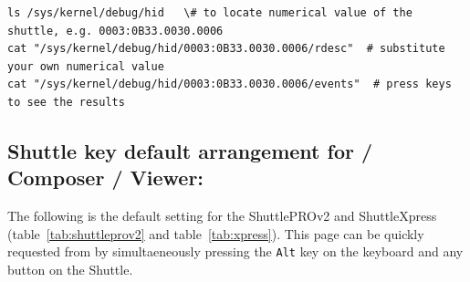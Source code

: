 \begin{lstlisting}[style=sh]
ls /sys/kernel/debug/hid   \# to locate numerical value of the shuttle, e.g. 0003:0B33.0030.0006
cat "/sys/kernel/debug/hid/0003:0B33.0030.0006/rdesc"  # substitute your own numerical value
cat "/sys/kernel/debug/hid/0003:0B33.0030.0006/events"  # press keys to see the results
\end{lstlisting}

\subsection{Shuttle key default arrangement for \CGG{} / Composer / Viewer:}%
\label{sub:shuttle_key_default_cinelerra}

The following is the default setting for the ShuttlePROv2 and
ShuttleXpress (table~\ref{tab:shuttleprov2} and
table~\ref{tab:xpress}).  This page can be quickly requested from \CGG{} by
simultaeneously pressing the \texttt{Alt} key on the keyboard and any button on the Shuttle.

